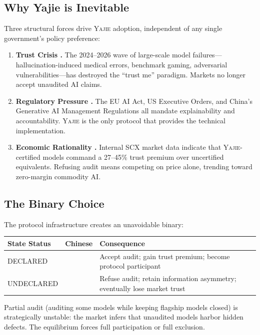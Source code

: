 \documentclass[11pt,a4paper]{article}
\theoremstyle{definition}
\theoremstyle{remark}
\newcommand{\Yajie}{\textsc{Yajie}}
\newcommand{\declaredState}{\textsf{DECLARED}}
\newcommand{\undeclaredState}{\textsf{UNDECLARED}}
\begin{document}
\subsection{Why Yajie is Inevitable}
Three structural forces drive \Yajie{} adoption, independent of any single government's policy preference:
\begin{enumerate}[label=(\roman*)]
    \item \textbf{Trust Crisis .} The 2024--2026 wave of large-scale model failures---hallucination-induced medical errors, benchmark gaming, adversarial vulnerabilities---has destroyed the ``trust me'' paradigm. Markets no longer accept unaudited AI claims.
    \item \textbf{Regulatory Pressure .} The EU AI Act, US Executive Orders, and China's Generative AI Management Regulations all mandate explainability and accountability. \Yajie{} is the only protocol that provides the technical implementation.
    \item \textbf{Economic Rationality .} Internal SCX market data indicate that \Yajie{}-certified models command a 27--45\% trust premium over uncertified equivalents. Refusing audit means competing on price alone, trending toward zero-margin commodity AI.
\end{enumerate}
\subsection{The Binary Choice}
The protocol infrastructure creates an unavoidable binary:
\begin{center}
\begin{tabular}{lll}
\toprule
\textbf{State Status} & \textbf{Chinese} & \textbf{Consequence } \\
\midrule
\declaredState &  & Accept audit; gain trust premium; become protocol participant \\
\undeclaredState &  & Refuse audit; retain information asymmetry; eventually lose market trust \\
\bottomrule
\end{tabular}
\end{center}
Partial audit (auditing some models while keeping flagship models closed) is strategically unstable: the market infers that unaudited models harbor hidden defects. The equilibrium forces full participation or full exclusion.
\end{document}

